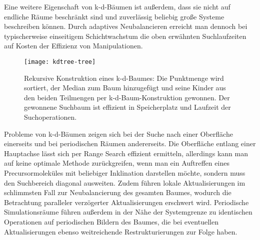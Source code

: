 Eine weitere Eigenschaft von k-d-Bäumen ist außerdem, dass sie nicht auf endliche Räume beschränkt sind und zuverlässig beliebig große Systeme beschreiben können.
Durch adaptives Neubalancieren erreicht man dennoch bei typischerweise einseitigem Schichtwachstum die oben erwähnten Suchlaufzeiten auf Kosten der Effizienz von Manipulationen.

\begin{figure}
  \texttt{[image: kdtree-tree]}
  \caption[Konstruktion eines k-d-Baumes]{
    Rekursive Konstruktion eines k-d-Baumes: Die Punktmenge wird sortiert, der Median zum Baum hinzugefügt und seine Kinder aus den beiden Teilmengen per k-d-Baum-Konstruktion gewonnen.
    Der gewonnene Suchbaum ist effizient in Speicherplatz und Laufzeit der Suchoperationen.
  }
  \label{fig:kdtree}
\end{figure}


Probleme von k-d-Bäumen zeigen sich bei der Suche nach einer Oberfläche einerseits und bei periodischen Räumen andererseits.
Die Oberfläche entlang einer Hauptachse lässt sich per Range Search effizient ermitteln, allerdings kann man auf keine optimale Methode zurückgreifen, wenn man ein Auftreffen eines Precursormoleküles mit beliebiger Inklination darstellen möchte, sondern muss den Suchbereich diagonal ausweiten.
Zudem führen lokale Aktualisierungen im schlimmsten Fall zur Neubalancierung des gesamten Baumes, wodurch die Betrachtung paralleler verzögerter Aktualisierungen erschwert wird.
Periodische Simulationsräume führen außerdem in der Nähe der Systemgrenze zu identischen Operationen auf periodischen Bildern des Baumes, die bei eventuellen Aktualisierungen ebenso weitreichende Restrukturierungen zur Folge haben.

